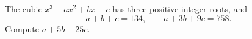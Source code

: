 The cubic $x^3-ax^2+bx-c$ has three positive integer roots, and
\[a+b+c=134,\qquad a+3b+9c=758.\]
Compute $a+5b+25c$.
